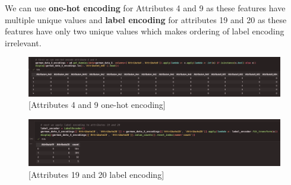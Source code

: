 \documentclass{article}
\begin{document}
    We can use \textbf{one-hot encoding} for Attributes 4 and 9 as these features have multiple
    unique values and \textbf{label encoding} for attributes 19 and 20 as these features have
    only two unique values which makes ordering of label encoding irrelevant.

    \begin{figure}[H]
        \centering
        \includegraphics[width=\textwidth, height=0.13\textheight]{./I_1_g_a.png}
        \caption{[Attributes 4 and 9 one-hot encoding]}
    \end{figure}
    \begin{figure}[H]
        \centering
        \includegraphics[width=\textwidth, height=0.13\textheight]{./I_1_g_b.png}
        \caption{[Attributes 19 and 20 label encoding]}
    \end{figure}
\end{document}
